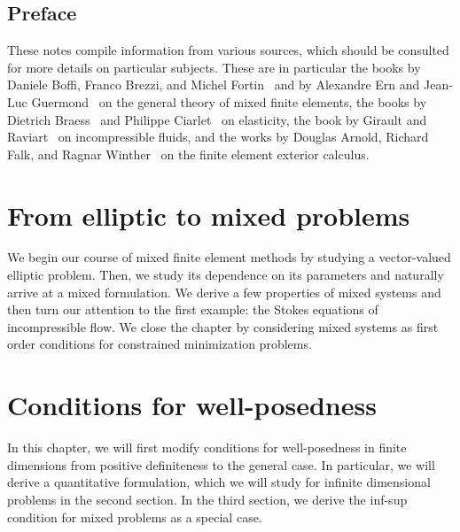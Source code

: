 
\maketitle

\section*{Preface}
%

These notes compile information from various sources, which should be
consulted for more details on particular subjects. These are in
particular the books by Daniele Boffi, Franco Brezzi, and Michel
Fortin~\cite{BoffiBrezziFortin13} and by Alexandre Ern and Jean-Luc
Guermond~\cite{ErnGuermond04} on the general theory of mixed
finite elements, the books by Dietrich Braess~\cite{Braess97,Braess13}
and Philippe Ciarlet~\cite{Ciarlet88} on elasticity, the book by
Girault and Raviart~\cite{GiraultRaviart86} on incompressible fluids,
and the works by Douglas Arnold, Richard Falk, and Ragnar
Winther~\cite{ArnoldFalkWinther06acta,ArnoldFalkWinther10} on the
finite element exterior calculus.

\thispagestyle{empty}
\setcounter{page}{0}


\tableofcontents

\chapter{From elliptic to mixed problems}
We begin our course of mixed finite element methods by studying a
vector-valued elliptic problem. Then, we study its dependence on its
parameters and naturally arrive at a mixed formulation. We derive a
few properties of mixed systems and then turn our attention to the
first example: the Stokes equations of incompressible flow. We close
the chapter by considering mixed systems as first order conditions
for constrained minimization problems.




\chapter{Conditions for well-posedness}
\label{sec:mixed-wellposedness}
In this chapter, we will first modify conditions for well-posedness in
finite dimensions from positive definiteness to the general case. In
particular, we will derive a quantitative formulation, which we will
study for infinite dimensional problems in the second section. In the
third section, we derive the inf-sup condition for mixed problems as a
special case.


